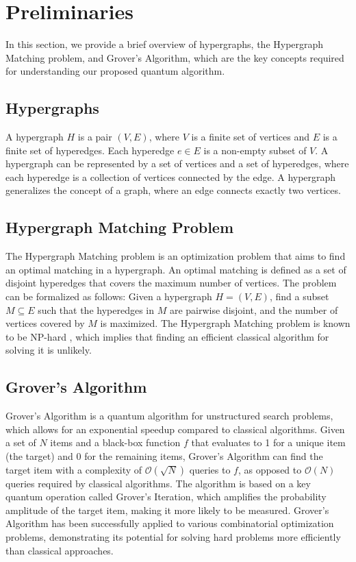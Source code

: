 \section{Preliminaries}\label{sec:preliminaries}

In this section, we provide a brief overview of hypergraphs, the Hypergraph Matching problem, and Grover's Algorithm, which are the key concepts required for understanding our proposed quantum algorithm.

\subsection{Hypergraphs}

A hypergraph $H$ is a pair $(V, E)$, where $V$ is a finite set of vertices and $E$ is a finite set of hyperedges. Each hyperedge $e \in E$ is a non-empty subset of $V$. A hypergraph can be represented by a set of vertices and a set of hyperedges, where each hyperedge is a collection of vertices connected by the edge. A hypergraph generalizes the concept of a graph, where an edge connects exactly two vertices.

\subsection{Hypergraph Matching Problem}

The Hypergraph Matching problem is an optimization problem that aims to find an optimal matching in a hypergraph. An optimal matching is defined as a set of disjoint hyperedges that covers the maximum number of vertices. The problem can be formalized as follows: Given a hypergraph $H=(V,E)$, find a subset $M \subseteq E$ such that the hyperedges in $M$ are pairwise disjoint, and the number of vertices covered by $M$ is maximized. The Hypergraph Matching problem is known to be NP-hard \cite{np_hard}, which implies that finding an efficient classical algorithm for solving it is unlikely.

\subsection{Grover's Algorithm}

Grover's Algorithm \cite{grover} is a quantum algorithm for unstructured search problems, which allows for an exponential speedup compared to classical algorithms. Given a set of $N$ items and a black-box function $f$ that evaluates to 1 for a unique item (the target) and 0 for the remaining items, Grover's Algorithm can find the target item with a complexity of $\mathcal{O}(\sqrt{N})$ queries to $f$, as opposed to $\mathcal{O}(N)$ queries required by classical algorithms. The algorithm is based on a key quantum operation called Grover's Iteration, which amplifies the probability amplitude of the target item, making it more likely to be measured. Grover's Algorithm has been successfully applied to various combinatorial optimization problems, demonstrating its potential for solving hard problems more efficiently than classical approaches.



